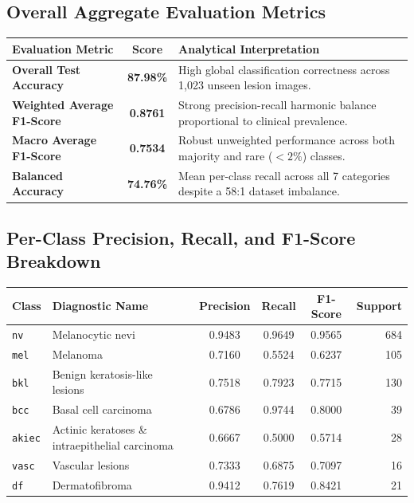 \documentclass[12pt,a4paper]{article}
\begin{document}
\subsection{Overall Aggregate Evaluation Metrics}
\begin{table}[h!]
\centering
\renewcommand{\arraystretch}{1.2}
\begin{tabularx}{\textwidth}{l c X}
\toprule
\textbf{Evaluation Metric} & \textbf{Score} & \textbf{Analytical Interpretation} \\
\midrule
\textbf{Overall Test Accuracy} & \textbf{87.98\%} & High global classification correctness across 1,023 unseen lesion images. \\
\textbf{Weighted Average F1-Score} & \textbf{0.8761} & Strong precision-recall harmonic balance proportional to clinical prevalence. \\
\textbf{Macro Average F1-Score} & \textbf{0.7534} & Robust unweighted performance across both majority and rare ($<2\%$) classes. \\
\textbf{Balanced Accuracy} & \textbf{74.76\%} & Mean per-class recall across all 7 categories despite a 58:1 dataset imbalance. \\
\bottomrule
\end{tabularx}
\end{table}

\subsection{Per-Class Precision, Recall, and F1-Score Breakdown}
\begin{table}[h!]
\centering
\renewcommand{\arraystretch}{1.2}
\begin{tabularx}{\textwidth}{l X c c c r}
\toprule
\textbf{Class} & \textbf{Diagnostic Name} & \textbf{Precision} & \textbf{Recall} & \textbf{F1-Score} & \textbf{Support} \\
\midrule
\texttt{nv} & Melanocytic nevi & 0.9483 & 0.9649 & 0.9565 & 684 \\
\texttt{mel} & Melanoma & 0.7160 & 0.5524 & 0.6237 & 105 \\
\texttt{bkl} & Benign keratosis-like lesions & 0.7518 & 0.7923 & 0.7715 & 130 \\
\texttt{bcc} & Basal cell carcinoma & 0.6786 & 0.9744 & 0.8000 & 39 \\
\texttt{akiec} & Actinic keratoses \& intraepithelial carcinoma & 0.6667 & 0.5000 & 0.5714 & 28 \\
\texttt{vasc} & Vascular lesions & 0.7333 & 0.6875 & 0.7097 & 16 \\
\texttt{df} & Dermatofibroma & 0.9412 & 0.7619 & 0.8421 & 21 \\
\bottomrule
\end{tabularx}
\end{table}
\end{document}
